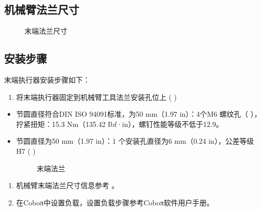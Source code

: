 \documentclass[a4paper,11pt,english,openany,oneside]{sphinxmanual}
\begin{document}
\subsection{机械臂法兰尺寸}
\label{\detokenize{08 _u5b89_u88c5_u4e0e_u8c03_u8bd5:id15}}\label{\detokenize{08 _u5b89_u88c5_u4e0e_u8c03_u8bd5:id16}}
\begin{figure}[H]
\centering
\capstart

\noindent{}
\caption{末端法兰尺寸}\label{\detokenize{08 _u5b89_u88c5_u4e0e_u8c03_u8bd5:id91}}\end{figure}




\subsection{安装步骤}
\label{\detokenize{08 _u5b89_u88c5_u4e0e_u8c03_u8bd5:id17}}\label{\detokenize{08 _u5b89_u88c5_u4e0e_u8c03_u8bd5:id18}}
\sphinxAtStartPar
末端执行器安装步骤如下：
\begin{enumerate}
%
\item {} 
\sphinxAtStartPar
将末端执行器固定到机械臂工具法兰安装孔位上 (  )

\end{enumerate}
\begin{itemize}
\item {} 
\sphinxAtStartPar
节圆直径符合DIN ISO 9409\sphinxhyphen{}1标准，为50 mm（1.97 in）：4个M6 螺纹孔（  ），拧紧扭矩：15.3 Nm（135.42 Ibf·in），螺钉性能等级不低于12.9。

\item {} 
\sphinxAtStartPar
节圆直径为50 mm（1.97 in）：1 个安装孔直径为6 mm（0.24 in），公差等级 H7 (  )

\begin{figure}[H]
\centering
\capstart

\noindent{}
\caption{末端法兰}\label{\detokenize{08 _u5b89_u88c5_u4e0e_u8c03_u8bd5:id92}}\end{figure}

\end{itemize}


\begin{enumerate}
%
\setcounter{enumi}{1}
\item {} 
\sphinxAtStartPar
机械臂末端法兰尺寸信息参考 {\hyperref[\detokenize{08 _u5b89_u88c5_u4e0e_u8c03_u8bd5:id15}]{}} 。

\item {} 
\sphinxAtStartPar
在Coboπ中设置负载，设置负载步骤参考Coboπ软件用户手册。

\end{enumerate}
\end{document}
